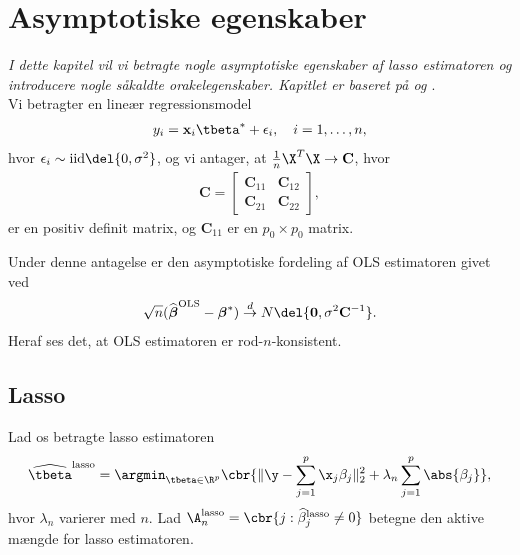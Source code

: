 \chapter{Asymptotiske egenskaber} \label{ch:asymptotics}
\textit{I dette kapitel vil vi betragte nogle asymptotiske egenskaber af lasso estimatoren og introducere nogle såkaldte orakelegenskaber.
Kapitlet er baseret på \cite{adaptive_lasso} og \cite{adaptive_lasso_knight}}. \\[4mm]
%


Vi betragter en lineær regressionsmodel 
\begin{align*}
y_i= \mathbf{x}_i \tbeta^* + \epsilon_i, \quad i = 1, \ldots, n,
\end{align*}
hvor \(\epsilon_i \sim \text{iid} \del{0, \sigma^2}\), og vi antager, at \(\frac{1}{n} \X^T \X \rightarrow \textbf{C}\), hvor
\begin{align*}
\textbf{C} = 
\begin{bmatrix}
\textbf{C}_{11}& \textbf{C}_{12}\\
\textbf{C}_{21}& \textbf{C}_{22}
\end{bmatrix},
\end{align*}
er en positiv definit matrix, og $\textbf{C}_{11}$ er en $p_0 \times p_0$ matrix. 

Under denne antagelse er den asymptotiske fordeling af OLS estimatoren givet ved
\begin{align*}
\sqrt{n}(\widehat{\boldsymbol{\beta}}^{\text{OLS}}-\boldsymbol{\beta}^*) \overset{d}{\rightarrow} N \del{\mathbf{0},\sigma^2 \mathbf{C}^{-1}}.
\end{align*}
Heraf ses det, at OLS estimatoren er rod-\(n\)-konsistent.

\section{Lasso}
Lad os betragte lasso estimatoren
\begin{align*}
\widehat{\tbeta}^\text{lasso} = \argmin_{\tbeta \in \R^p} \cbr{ \Vert \y - \sum_{j=1}^p \x_j \beta_j \Vert_2^2 + \lambda_n \sum_{j=1}^p \abs{ \beta_j }},
\end{align*}
hvor \(\lambda_n\) varierer med \(n\).
Lad \(\A_n^\text{lasso} = \cbr{j : \widehat{\beta}_j^\text{lasso} \neq 0}\) betegne den aktive mængde for lasso estimatoren.

